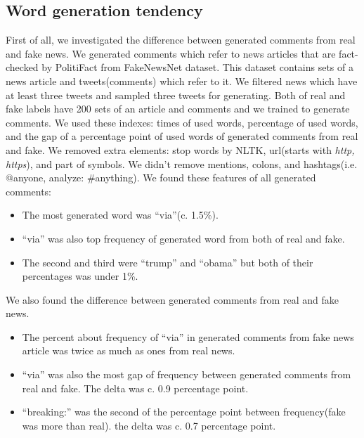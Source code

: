 \documentclass[conference]{IEEEtran}
\begin{document}
\subsection{Word generation tendency}
\label{subsec:trend}
First of all, we investigated the difference between generated comments from real and fake news.
We generated comments which refer to news articles that are fact-checked by PolitiFact from FakeNewsNet dataset\cite{Shu2018FakeNewsNetAD}.
This dataset contains sets of a news article and tweets(comments) which refer to it.
We filtered news which have at least three tweets and sampled three tweets for generating.
Both of real and fake labels have 200 sets of an article and comments and we trained to generate comments. 
We used these indexes: times of used words, percentage of used words, and the gap of a percentage point of used words of generated comments from real and fake.
We removed extra elements: stop words by NLTK, url(starts with \textit{http, https}), and part of symbols.
We didn't remove mentions, colons, and hashtags(i.e. @anyone, analyze: \#anything).
We found these features of all generated comments:
\begin{itemize}[]
    \item The most generated word was ``via''(c. 1.5\%).  
    \item ``via'' was also top frequency of generated word from both of real and fake. 
    \item The second and third were ``trump'' and ``obama'' but both of their percentages was under 1\%.
\end{itemize}
We also found the difference between generated comments from real and fake news.
\begin{itemize}[]
    \item The percent about frequency of ``via'' in generated comments from fake news article was twice as much as ones from real news.
    \item ``via'' was also the most gap of frequency between generated comments from real and fake.  The delta was c. 0.9 percentage point.
    \item ``breaking:'' was the second of the percentage point between frequency(fake was more than real). the delta was c. 0.7 percentage point.
\end{itemize}
\end{document}
